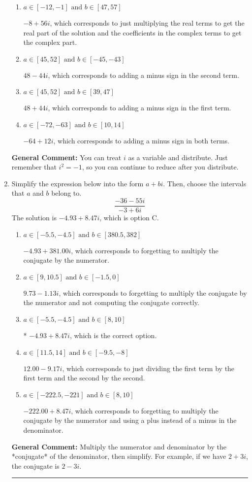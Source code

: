 \documentclass{extbook}[14pt]
\newcommand{\litem}[1]{\item #1

\rule{\textwidth}{0.4pt}}
\begin{document}
\begin{enumerate}
{\begin{enumerate}[label=\Alph*.]
* $-64 - 12 i$, which is the correct option.
\item \( a \in [-12, -1] \text{ and } b \in [47, 57] \)

 $-8 + 56 i$, which corresponds to just multiplying the real terms to get the real part of the solution and the coefficients in the complex terms to get the complex part.
\item \( a \in [45, 52] \text{ and } b \in [-45, -43] \)

 $48 - 44 i$, which corresponds to adding a minus sign in the second term.
\item \( a \in [45, 52] \text{ and } b \in [39, 47] \)

 $48 + 44 i$, which corresponds to adding a minus sign in the first term.
\item \( a \in [-72, -63] \text{ and } b \in [10, 14] \)

 $-64 + 12 i$, which corresponds to adding a minus sign in both terms.
\end{enumerate}

\textbf{General Comment:} You can treat $i$ as a variable and distribute. Just remember that $i^2=-1$, so you can continue to reduce after you distribute.
}
\litem{
Simplify the expression below into the form $a+bi$. Then, choose the intervals that $a$ and $b$ belong to.
\[ \frac{-36 - 55 i}{-3 + 6 i} \]
The solution is \( -4.93  + 8.47 i \), which is option C.\begin{enumerate}[label=\Alph*.]
\item \( a \in [-5.5, -4.5] \text{ and } b \in [380.5, 382] \)

 $-4.93  + 381.00 i$, which corresponds to forgetting to multiply the conjugate by the numerator.
\item \( a \in [9, 10.5] \text{ and } b \in [-1.5, 0] \)

 $9.73  - 1.13 i$, which corresponds to forgetting to multiply the conjugate by the numerator and not computing the conjugate correctly.
\item \( a \in [-5.5, -4.5] \text{ and } b \in [8, 10] \)

* $-4.93  + 8.47 i$, which is the correct option.
\item \( a \in [11.5, 14] \text{ and } b \in [-9.5, -8] \)

 $12.00  - 9.17 i$, which corresponds to just dividing the first term by the first term and the second by the second.
\item \( a \in [-222.5, -221] \text{ and } b \in [8, 10] \)

 $-222.00  + 8.47 i$, which corresponds to forgetting to multiply the conjugate by the numerator and using a plus instead of a minus in the denominator.
\end{enumerate}

\textbf{General Comment:} Multiply the numerator and denominator by the *conjugate* of the denominator, then simplify. For example, if we have $2+3i$, the conjugate is $2-3i$.
}
\end{enumerate}
\end{document}
